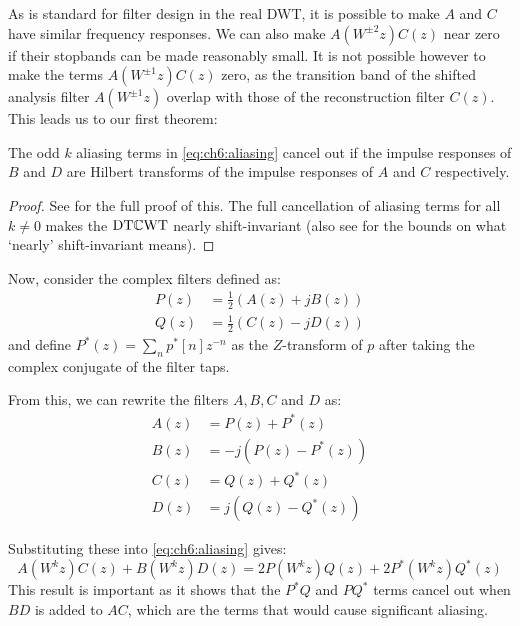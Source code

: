 As is standard for filter design in the real DWT, it is possible to make $A$ and $C$ have
similar frequency responses. We can also make $A(W^{\pm 2}z) C(z)$ near zero if
their stopbands can be made reasonably small. It is not possible however to make
the terms $A(W^{\pm 1}z)C(z)$ zero, as the transition band of the shifted
analysis filter $A(W^{\pm 1}z)$ overlap with those of the reconstruction filter
$C(z)$. This leads us to our first theorem:

\begin{theorem} \label{thm:ch6:shiftinv}
  The odd $k$ aliasing terms in \eqref{eq:ch6:aliasing} cancel out if the impulse
  responses of $B$ and $D$ are Hilbert transforms of the impulse responses of
  $A$ and $C$ respectively.
\end{theorem}

\begin{proof}
  See \cite[section 4]{kingsbury_complex_2001} for the full proof of
  this. The full cancellation of aliasing terms for all $k \neq 0$ makes the $\mathrm{DT}\mathbb{C}\mathrm{WT}$ 
  nearly shift-invariant (also see \cite[section 7]{kingsbury_complex_2001} for the
  bounds on what `nearly' shift-invariant means).  
\end{proof}

Now, consider the complex filters defined as:
\begin{align}
  P(z) &= \frac{1}{2}\left(A(z) + jB(z)\right) \label{eq:appD:p_eq}\\
  Q(z) &= \frac{1}{2}\left(C(z) - jD(z)\right) \label{eq:appD:q_eq}
\end{align}
and define $P^*(z) = \sum_{n} p^{*}[n] z^{-n}$ as the $Z$-transform of $p$
after taking the complex conjugate of the filter taps. 

From this, we can rewrite the filters $A, B, C$ and $D$ as:
\begin{align}
  A(z) &= P(z) + P^*(z) \\
  B(z) &= -j(P(z) - P^*(z)) \\
  C(z) &= Q(z) + Q^*(z) \\
  D(z) &= j(Q(z) - Q^*(z))
\end{align}

Substituting these into \eqref{eq:ch6:aliasing} gives:
\begin{equation}
  A(W^k z)C(z) + B(W^k z)D(z) = 2P(W^kz)Q(z) + 2P^*(W^kz)Q^*(z) \label{eq:ch6:complex_filts}
\end{equation}
This result is important as it shows that the $P^*Q$ and
$PQ^*$ terms cancel out when $BD$ is added to $AC$, which are the terms that
would cause significant aliasing.

